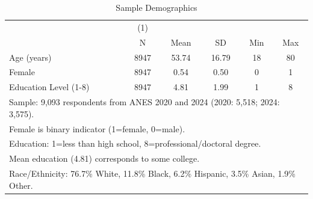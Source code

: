 \begin{table}[htbp]\centering
\def\sym#1{\ifmmode^{#1}\else\(^{#1}\)\fi}
\caption{Sample Demographics}
\begin{tabular}{l*{1}{ccccc}}
\toprule
                    &\multicolumn{1}{c}{(1)}&            &            &            &            \\
                    &           N&        Mean&          SD&         Min&         Max\\
\midrule
Age (years)         &        8947&       53.74&       16.79&          18&          80\\
Female              &        8947&        0.54&        0.50&           0&           1\\
Education Level (1-8)&        8947&        4.81&        1.99&           1&           8\\
\bottomrule
\multicolumn{6}{l}{\footnotesize Sample: 9,093 respondents from ANES 2020 and 2024 (2020: 5,518; 2024: 3,575).}\\
\multicolumn{6}{l}{\footnotesize Female is binary indicator (1=female, 0=male).}\\
\multicolumn{6}{l}{\footnotesize Education: 1=less than high school, 8=professional/doctoral degree.}\\
\multicolumn{6}{l}{\footnotesize Mean education (4.81) corresponds to some college.}\\
\multicolumn{6}{l}{\footnotesize Race/Ethnicity: 76.7\% White, 11.8\% Black, 6.2\% Hispanic, 3.5\% Asian, 1.9\% Other.}\\
\end{tabular}
\end{table}
